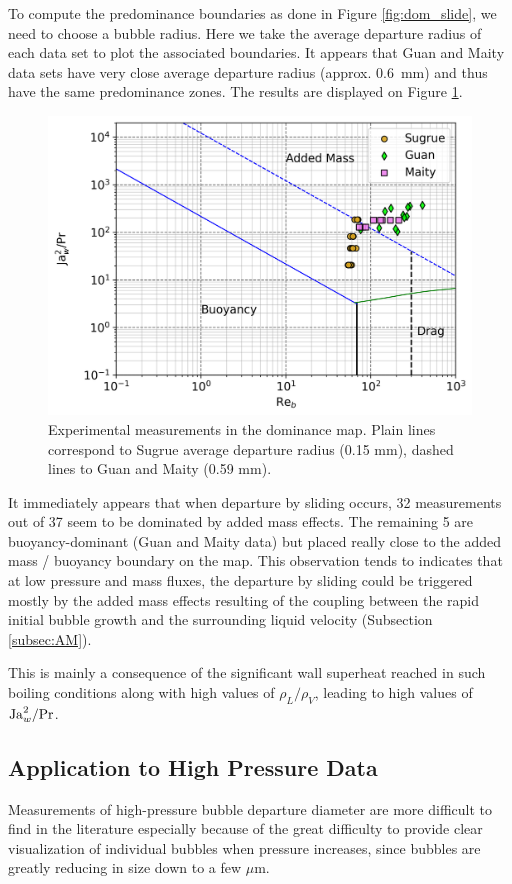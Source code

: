 To compute the predominance boundaries as done in Figure \ref{fig:dom_slide}, we need to choose a bubble radius. Here we take the average departure radius of each data set to plot the associated boundaries. It appears that Guan and Maity data sets have very close average departure radius (approx. 0.6\ mm) and thus have the same predominance zones. The results are displayed on Figure \ref{fig:exp_dom}.
\begin{figure}[!htb]
\vspace{16pt}
\centering
\includegraphics[width=0.6\linewidth]{img/forces/all_auth_map.png}
\caption{Experimental measurements in the dominance map. Plain lines correspond to Sugrue average departure radius (0.15 mm), dashed lines to Guan and Maity (0.59 mm).}
\label{fig:exp_dom}
\vspace{16pt}
\end{figure}

It immediately appears that when departure by sliding occurs, 32 measurements out of 37 seem to be dominated by added mass effects. The remaining 5 are buoyancy-dominant (Guan and Maity data) but placed really close to the added mass / buoyancy boundary on the map. This observation tends to indicates that at low pressure and mass fluxes, the departure by sliding could be triggered mostly by the added mass effects resulting of the coupling between the rapid initial bubble growth and the surrounding liquid velocity (Subsection \ref{subsec:AM}). 

This is mainly a consequence of the significant wall superheat reached in such boiling conditions along with high values of $\rho_{L}/\rho_{V}$, leading to high values of $\mathrm{Ja}_{w}^{2}/\mathrm{Pr}$. 


\subsection{Application to High Pressure Data}

Measurements of high-pressure bubble departure diameter are more difficult to find in the literature especially because of the great difficulty to provide clear visualization of individual bubbles when pressure increases, since bubbles are greatly reducing in size down to a few $\mu$m. 

